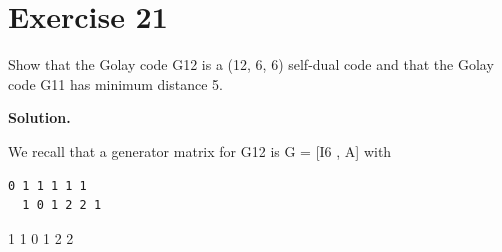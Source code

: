 \documentclass[11pt]{article}
\begin{document}
\section*{Exercise 21}
\begin{exercisebox}
Show that the Golay code G12 is a (12, 6, 6) self-dual code and that the Golay code G11 has minimum distance 5.

\end{exercisebox}
\begin{solutionbox}
\textbf{Solution.}

We recall that a generator matrix for G12 is G = [I6 , A] with

\begin{Verbatim}[fontsize=\small]
0 1 1 1 1 1
  1 0 1 2 2 1
\end{Verbatim}
1 1 0 1 2 2


\end{solutionbox}
\end{document}
